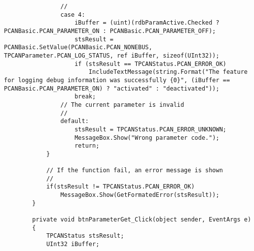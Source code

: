 \begin{lstlisting}
                //
                case 4:
                    iBuffer = (uint)(rdbParamActive.Checked ? PCANBasic.PCAN_PARAMETER_ON : PCANBasic.PCAN_PARAMETER_OFF);
                    stsResult = PCANBasic.SetValue(PCANBasic.PCAN_NONEBUS, TPCANParameter.PCAN_LOG_STATUS, ref iBuffer, sizeof(UInt32));
                    if (stsResult == TPCANStatus.PCAN_ERROR_OK)
                        IncludeTextMessage(string.Format("The feature for logging debug information was successfully {0}", (iBuffer == PCANBasic.PCAN_PARAMETER_ON) ? "activated" : "deactivated"));
                    break;
                // The current parameter is invalid
                //
                default:
                    stsResult = TPCANStatus.PCAN_ERROR_UNKNOWN;
                    MessageBox.Show("Wrong parameter code.");
                    return;
            }

            // If the function fail, an error message is shown
            //
            if(stsResult != TPCANStatus.PCAN_ERROR_OK)
                MessageBox.Show(GetFormatedError(stsResult));
        }

        private void btnParameterGet_Click(object sender, EventArgs e)
        {
            TPCANStatus stsResult;
            UInt32 iBuffer;


\end{lstlisting}
